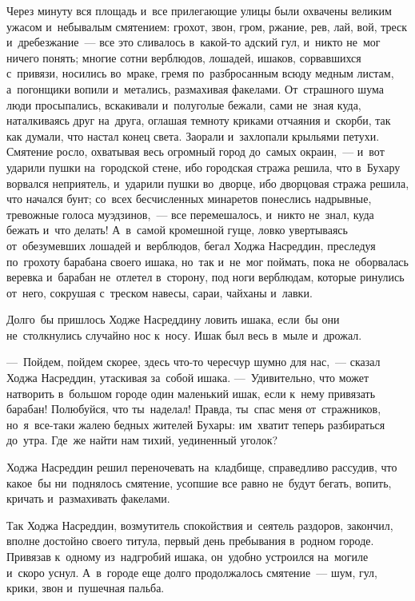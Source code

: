 \documentclass[12pt,a4paper]{book}
\begin{document}
Через минуту вся площадь и~все прилегающие улицы были охвачены великим ужасом и~небывалым смятением: грохот, звон, гром, ржание, рев, лай, вой, треск и~дребезжание~— все это сливалось в~какой-то адский гул, и~никто не~мог ничего понять; многие сотни верблюдов, лошадей, ишаков, сорвавшихся с~привязи, носились во~мраке, гремя по~разбросанным всюду медным листам, а~погонщики вопили и~метались, размахивая факелами. От~страшного шума люди просыпались, вскакивали и~полуголые бежали, сами не~зная куда, наталкиваясь друг на~друга, оглашая темноту криками отчаяния и~скорби, так как думали, что настал конец света. Заорали и~захлопали крыльями петухи. Смятение росло, охватывая весь огромный город до~самых окраин,~— и~вот ударили пушки на~городской стене, ибо городская стража решила, что в~Бухару ворвался неприятель, и~ударили пушки во~дворце, ибо дворцовая стража решила, что начался бунт; со~всех бесчисленных минаретов понеслись надрывные, тревожные голоса муэдзинов,~— все перемешалось, и~никто не~знал, куда бежать и~что делать! А~в~самой кромешной гуще, ловко увертываясь от~обезумевших лошадей и~верблюдов, бегал Ходжа Насреддин, преследуя по~грохоту барабана своего ишака, но~так и~не~мог поймать, пока не~оборвалась веревка и~барабан не~отлетел в~сторону, под ноги верблюдам, которые ринулись от~него, сокрушая с~треском навесы, сараи, чайханы и~лавки.

Долго~бы пришлось Ходже Насреддину ловить ишака, если~бы они не~столкнулись случайно нос к~носу. Ишак был весь в~мыле и~дрожал.

—~Пойдем, пойдем скорее, здесь что-то чересчур шумно для нас,~— сказал Ходжа Насреддин, утаскивая за~собой ишака. —~Удивительно, что может натворить в~большом городе один маленький ишак, если к~нему привязать барабан! Полюбуйся, что ты~наделал! Правда, ты~спас меня от~стражников, но~я~все-таки жалею бедных жителей Бухары: им~хватит теперь разбираться до~утра. Где~же найти нам тихий, уединенный уголок?

Ходжа Насреддин решил переночевать на~кладбище, справедливо рассудив, что какое~бы ни~поднялось смятение, усопшие все равно не~будут бегать, вопить, кричать и~размахивать факелами.

Так Ходжа Насреддин, возмутитель спокойствия и~сеятель раздоров, закончил, вполне достойно своего титула, первый день пребывания в~родном городе. Привязав к~одному из~надгробий ишака, он~удобно устроился на~могиле и~скоро уснул. А~в~городе еще долго продолжалось смятение~— шум, гул, крики, звон и~пушечная пальба.


\chapter{}
\end{document}
